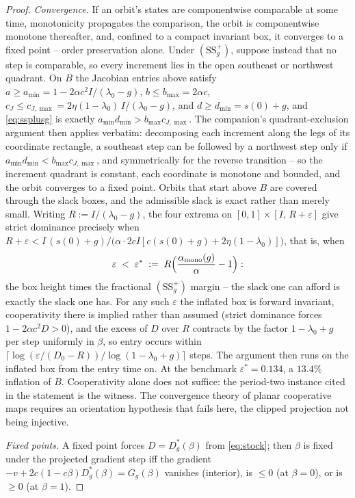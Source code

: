\documentclass[11pt]{article}
\theoremstyle{definition}
\theoremstyle{remark}
\numberwithin{equation}{section}
\begin{document}
\begin{proof}
\emph{Convergence.} If an orbit's states are componentwise comparable at some time, monotonicity propagates the comparison, the orbit is componentwise monotone thereafter, and, confined to a compact invariant box, it converges to a fixed point -- order preservation alone. Under $(\mathrm{SS}^+_g)$, suppose instead that no step is comparable, so every increment lies in the open southeast or northwest quadrant. On $B$ the Jacobian entries above satisfy $a \ge a_{\min} = 1-2\alpha c^2I/(\lambda_0-g)$, $b \le b_{\max} = 2\alpha c$, $c_J \le c_{J,\max} = 2\eta(1-\lambda_0)\,I/(\lambda_0-g)$, and $d \ge d_{\min} = s(0)+g$, and \eqref{eq:ssplusg} is exactly $a_{\min}d_{\min} > b_{\max}c_{J,\max}$. The companion's quadrant-exclusion argument \citep{hofheinz2026drift} then applies verbatim: decomposing each increment along the legs of its coordinate rectangle, a southeast step can be followed by a northwest step only if $a_{\min}d_{\min} < b_{\max}c_{J,\max}$, and symmetrically for the reverse transition -- so the increment quadrant is constant, each coordinate is monotone and bounded, and the orbit converges to a fixed point. Orbits that start above $B$ are covered through the slack boxes, and the admissible slack is exact rather than merely small. Writing $R := I/(\lambda_0-g)$, the four extrema on $[0,1]\times[I,\,R+\varepsilon]$ give strict dominance precisely when $R+\varepsilon < I\,(s(0)+g)/\bigl(\alpha\cdot 2cI[c(s(0)+g)+2\eta(1-\lambda_0)]\bigr)$, that is, when
\[
\varepsilon \;<\; \varepsilon^\ast \;:=\; R\Bigl(\frac{\alpha_{\mathrm{mono}}(g)}{\alpha}-1\Bigr):
\]
the box height times the fractional $(\mathrm{SS}^+_g)$ margin -- the slack one can afford is exactly the slack one has. For any such $\varepsilon$ the inflated box is forward invariant, cooperativity there is implied rather than assumed (strict dominance forces $1-2\alpha c^2D>0$), and the excess of $D$ over $R$ contracts by the factor $1-\lambda_0+g$ per step uniformly in $\beta$, so entry occurs within $\lceil\log(\varepsilon/(D_0-R))/\log(1-\lambda_0+g)\rceil$ steps. The argument then runs on the inflated box from the entry time on. At the benchmark $\varepsilon^\ast = 0.134$, a $13.4\%$ inflation of $B$. Cooperativity alone does not suffice: the period-two instance cited in the statement is the witness. The convergence theory of planar cooperative maps \citep{smith1998planar} requires an orientation hypothesis that fails here, the clipped projection not being injective.

\emph{Fixed points.} A fixed point forces $D=D^\ast_g(\beta)$ from \eqref{eq:stock}; then $\beta$ is fixed under the projected gradient step iff the gradient $-v+2c(1-c\beta)D^\ast_g(\beta)=G_g(\beta)$ vanishes (interior), is $\le 0$ (at $\beta=0$), or is $\ge 0$ (at $\beta=1$).


\end{proof}
\end{document}

